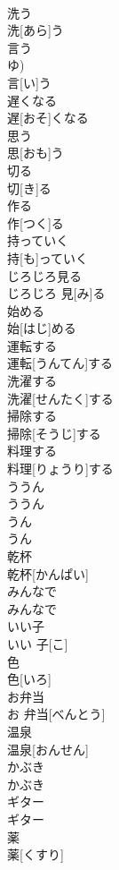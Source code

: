 \documentclass[8pt]{extreport}
\begin{document}
\begin{CJK}{UTF8}{min}
\\	洗う	
\\	洗[あら]う
\\	言う 
\\	ゆ)	
\\	言[い]う
\\	遅くなる	
\\	遅[おそ]くなる
\\	思う	
\\	思[おも]う
\\	切る	
\\	切[き]る
\\	作る	
\\	作[つく]る
\\	持っていく	
\\	持[も]っていく
\\	じろじろ見る	
\\	じろじろ 見[み]る
\\	始める	
\\	始[はじ]める
\\	運転する	
\\	運転[うんてん]する
\\	洗濯する	
\\	洗濯[せんたく]する
\\	掃除する	
\\	掃除[そうじ]する
\\	料理する	
\\	料理[りょうり]する
\\	ううん	
\\	ううん
\\	うん	
\\	うん
\\	乾杯	
\\	乾杯[かんぱい]
\\	みんなで	
\\	みんなで
\\	いい子	
\\	いい 子[こ]
\\	色	
\\	色[いろ]
\\	お弁当	
\\	お 弁当[べんとう]
\\	温泉	
\\	温泉[おんせん]
\\	かぶき	
\\	かぶき
\\	ギター	
\\	ギター
\\	薬	
\\	薬[くすり]

\end{CJK}
\end{document}
